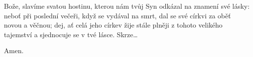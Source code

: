 \mbox{}

Bože, slavíme svatou hostinu, kterou nám tvůj Syn odkázal na znamení své lásky: neboť při poslední večeři, když se vydával na smrt, dal se své církvi za oběť novou a věčnou; dej, ať celá jeho církev žije stále plněji z tohoto velikého tajemství a sjednocuje se v tvé lásce. Skrze…

\Rbardot{} Amen.

